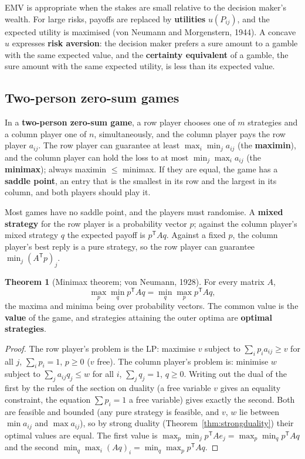 \documentclass[11pt,a4paper]{article}
\numberwithin{equation}{section}
\theoremstyle{definition}
\newtheorem{thm}{Theorem}[subsection]
\begin{document}
EMV is appropriate when the stakes are small relative to the decision maker's wealth. For large risks, payoffs are replaced by \textbf{utilities} $u(P_{ij})$, and the expected utility is maximised (von Neumann and Morgenstern, 1944). A concave $u$ expresses \textbf{risk aversion}: the decision maker prefers a sure amount to a gamble with the same expected value, and the
\textbf{certainty equivalent} of a gamble, the sure amount with the same expected utility, is less than its expected value.

\subsection{Two-person zero-sum games}
\label{ssec:zerosum}

In a \textbf{two-person zero-sum game}, a row player chooses one of $m$ strategies and a column player one of $n$, simultaneously, and the column player pays the row player $a_{ij}$. The row player can guarantee at least $\max_i\min_ja_{ij}$ (the \textbf{maximin}), and the column player can hold the loss to at most
$\min_j\max_ia_{ij}$ (the \textbf{minimax}); always maximin $\leq$ minimax. If they are equal, the game has a \textbf{saddle point}, an entry that is the smallest in its row and the largest in its column, and both players should play it.

Most games have no saddle point, and the players must randomise. A \textbf{mixed strategy} for the row player is a probability vector $p$; against the column player's mixed strategy $q$ the expected payoff is $p^{\mathsf T}Aq$. Against a fixed $p$, the column player's best reply is a pure strategy, so the row player can guarantee
$\min_j(A^{\mathsf T}p)_j$.

\begin{thm}[Minimax theorem; von Neumann, 1928]
\label{thm:minimax}
For every matrix $A$,
\[
\max_p\min_qp^{\mathsf T}Aq = \min_q\max_pp^{\mathsf T}Aq ,
\]
the maxima and minima being over probability vectors. The common value is the \textbf{value} of the game, and strategies attaining the outer optima are \textbf{optimal strategies}.
\end{thm}

\begin{proof}
The row player's problem is the LP: maximise $v$ subject to $\sum_ip_ia_{ij} \geq v$ for all $j$, $\sum_ip_i = 1$, $p \geq 0$ ($v$ free). The column player's problem is: minimise $w$ subject to $\sum_ja_{ij}q_j \leq w$ for all $i$, $\sum_jq_j = 1$, $q \geq 0$. Writing out the dual of the first by the rules of the section on duality (a free
variable $v$ gives an equality constraint, the equation $\sum p_i = 1$ a free variable) gives exactly the second. Both are feasible and bounded (any pure strategy is feasible, and $v$, $w$ lie between $\min a_{ij}$ and $\max a_{ij}$), so by strong duality (Theorem~\ref{thm:strongduality}) their optimal values are equal. The first value is $\max_p\min_jp^{\mathsf T}Ae_j = \max_p\min_qp^{\mathsf T}Aq$
and the second $\min_q\max_i(Aq)_i = \min_q\max_pp^{\mathsf T}Aq$.
\end{proof}
\end{document}
